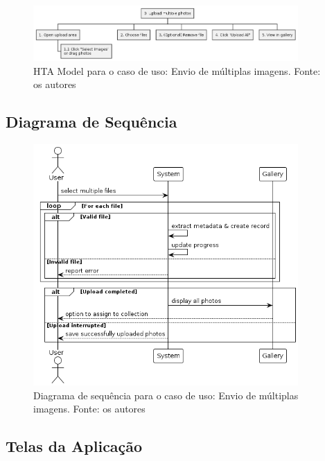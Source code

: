 \begin{figure}[H]
    \centering
    \includegraphics[width=0.9\textwidth]{../figures/hta/UC002.png}
    \caption{HTA Model para o caso de uso: Envio de múltiplas imagens. Fonte: os autores}
    \label{fig:hta-uc002}
\end{figure}

\subsection{Diagrama de Sequência}

\begin{figure}[H]
    \centering
    \includegraphics[width=0.9\textwidth]{../figures/dss/UC002.png}
    \caption{Diagrama de sequência para o caso de uso: Envio de múltiplas imagens. Fonte: os autores}
    \label{fig:dss-uc002}
\end{figure}

\subsection{Telas da Aplicação}

